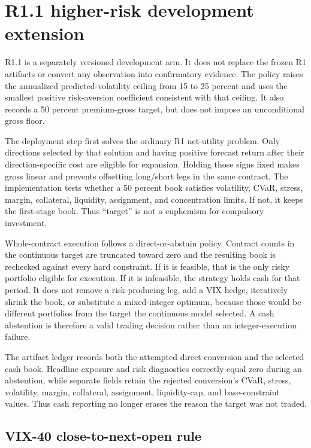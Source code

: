 \clearpage
\section{R1.1 higher-risk development extension}
\label{sec:r11_update}

R1.1 is a separately versioned development arm. It does not replace the frozen R1
artifacts or convert any observation into confirmatory evidence. The policy raises the
annualized predicted-volatility ceiling from 15 to 25 percent and uses the smallest
positive risk-aversion coefficient consistent with that ceiling. It also records a 50
percent premium-gross target, but does not impose an unconditional gross floor.

The deployment step first solves the ordinary R1 net-utility problem. Only directions
selected by that solution and having positive forecast return after their direction-specific
cost are eligible for expansion. Holding those signs fixed makes gross linear and prevents
offsetting long/short legs in the same contract. The implementation tests whether a
50 percent book satisfies volatility, CVaR, stress, margin, collateral, liquidity,
assignment, and concentration limits. If not, it keeps the first-stage book. Thus
``target'' is not a euphemism for compulsory investment.

Whole-contract execution follows a direct-or-abstain policy. Contract counts in the
continuous target are truncated toward zero and the resulting book is rechecked against
every hard constraint. If it is feasible, that is the only risky portfolio eligible for
execution. If it is infeasible, the strategy holds cash for that period. It does not
remove a risk-producing leg, add a VIX hedge, iteratively shrink the book, or substitute a
mixed-integer optimum, because those would be different portfolios from the target the
continuous model selected. A cash abstention is therefore a valid trading decision rather
than an integer-execution failure.

The artifact ledger records both the attempted direct conversion and the selected cash
book. Headline exposure and risk diagnostics correctly equal zero during an abstention,
while separate fields retain the rejected conversion's CVaR, stress, volatility, margin,
collateral, assignment, liquidity-cap, and base-constraint values. Thus cash reporting no
longer erases the reason the target was not traded.

\subsection{VIX-40 close-to-next-open rule}

